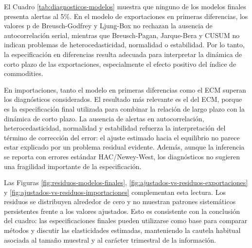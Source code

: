 \documentclass[11pt]{article}
\begin{document}
\begin{table}[H]
\centering
\caption{Diagnósticos de los modelos econométricos finales.}
\label{tab:diagnosticos-modelos}
\small
{}
\end{table}

El Cuadro \ref{tab:diagnosticos-modelos} muestra que ninguno de los modelos
finales presenta alertas al 5\%. En el modelo de exportaciones en primeras
diferencias, los valores p de Breusch-Godfrey y Ljung-Box no rechazan la ausencia
de autocorrelación serial, mientras que Breusch-Pagan, Jarque-Bera y CUSUM no
indican problemas de heterocedasticidad, normalidad o estabilidad. Por lo tanto,
la especificación en diferencias resulta adecuada para interpretar la dinámica
de corto plazo de las exportaciones, especialmente el efecto positivo del índice
de commodities.

En importaciones, tanto el modelo en primeras diferencias como el ECM superan
los diagnósticos considerados. El resultado más relevante es el del ECM, porque
es la especificación final utilizada para combinar la relación de largo plazo
con la dinámica de corto plazo. La ausencia de alertas en autocorrelación,
heterocedasticidad, normalidad y estabilidad refuerza la interpretación del
término de corrección del error: el ajuste estimado hacia el equilibrio no
parece estar explicado por un problema residual evidente. Además, aunque la
inferencia se reporta con errores estándar HAC/Newey-West, los diagnósticos no
sugieren una fragilidad importante de la especificación.

Las Figuras \ref{fig:residuos-modelos-finales},
\ref{fig:ajustados-vs-residuos-exportaciones} y
\ref{fig:ajustados-vs-residuos-importaciones} complementan esta lectura. Los
residuos se distribuyen alrededor de cero y no muestran patrones sistemáticos
persistentes frente a los valores ajustados. Esto es consistente con la
conclusión del cuadro: las especificaciones finales pueden utilizarse como base
para comparar métodos y discutir las elasticidades estimadas, manteniendo la
cautela habitual asociada al tamaño muestral y al carácter trimestral de la
información.
\end{document}
